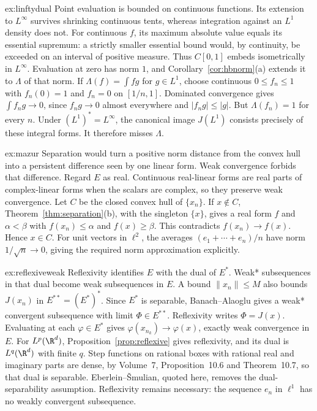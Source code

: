 \begin{solution}{ex:linftydual}
\idea Point evaluation is bounded on continuous functions. Its extension to $L^\infty$ survives shrinking continuous tents, whereas integration against an $L^1$ density does not.
\writeup For continuous $f$, its maximum absolute value equals its essential supremum: a strictly smaller essential bound would, by continuity, be exceeded on an interval of positive measure. Thus $C[0,1]$ embeds isometrically in $L^\infty$. Evaluation at zero has norm $1$, and Corollary~\ref{cor:hbnorm}(a) extends it to $\Lambda$ of that norm. If $\Lambda(f)=\int fg$ for $g\in L^1$, choose continuous $0\le f_n\le1$ with $f_n(0)=1$ and $f_n=0$ on $[1/n,1]$. Dominated convergence gives $\int f_ng\to0$, since $f_ng\to0$ almost everywhere and $|f_ng|\le|g|$. But $\Lambda(f_n)=1$ for every $n$. Under $(L^1)^*=L^\infty$, the canonical image $J(L^1)$ consists precisely of these integral forms. It therefore misses $\Lambda$.
\end{solution}
\begin{solution}{ex:mazur}
\idea Separation would turn a positive norm distance from the convex hull into a persistent difference seen by one linear form. Weak convergence forbids that difference.
\writeup Regard $E$ as real. Continuous real-linear forms are real parts of complex-linear forms when the scalars are complex, so they preserve weak convergence. Let $C$ be the closed convex hull of $\{x_n\}$. If $x\notin C$, Theorem~\ref{thm:separation}(b), with the singleton $\{x\}$, gives a real form $f$ and $\alpha<\beta$ with $f(x_n)\le\alpha$ and $f(x)\ge\beta$. This contradicts $f(x_n)\to f(x)$. Hence $x\in C$. For unit vectors in $\ell^2$, the averages $(e_1+\cdots+e_n)/n$ have norm $1/\sqrt n\to0$, giving the required norm approximation explicitly.
\end{solution}
\begin{solution}{ex:reflexiveweak}
\idea Reflexivity identifies $E$ with the dual of $E^*$. Weak* subsequences in that dual become weak subsequences in $E$.
\writeup A bound $\|x_n\|\le M$ also bounds $J(x_n)$ in $E^{**}=(E^*)^*$. Since $E^*$ is separable, Banach--Alaoglu gives a weak* convergent subsequence with limit $\Phi\in E^{**}$. Reflexivity writes $\Phi=J(x)$. Evaluating at each $\varphi\in E^*$ gives $\varphi(x_{n_k})\to\varphi(x)$, exactly weak convergence in $E$. For $L^p(\R^d)$, Proposition~\ref{prop:reflexive} gives reflexivity, and its dual is $L^q(\R^d)$ with finite $q$. Step functions on rational boxes with rational real and imaginary parts are dense, by Volume~7, Proposition~10.6 and Theorem~10.7, so that dual is separable. Eberlein--\v Smulian, quoted here, removes the dual-separability assumption. Reflexivity remains necessary: the sequence $e_n$ in $\ell^1$ has no weakly convergent subsequence.
\end{solution}
